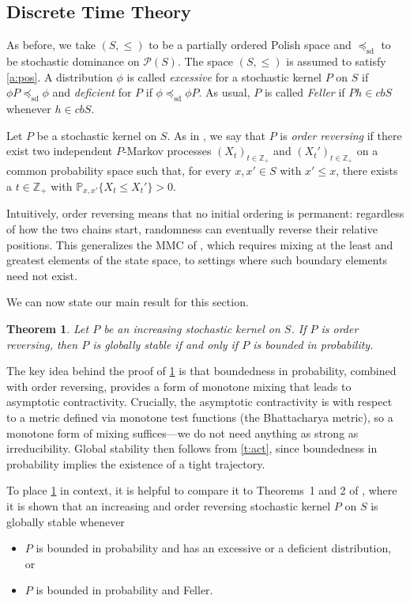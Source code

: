 \documentclass[12pt,reqno]{amsart}
\numberwithin{equation}{section}
\newtheorem{theorem}{Theorem}[section]
\theoremstyle{definition}
\newcommand{\1}{\mathbbm{1}}
\newcommand{\ZZ}{\mathbb{Z}}
\newcommand{\PP}{\mathbb P}
\newcommand{\pP}{\mathscr{P}}
\newcommand{\precsd}{\preceq_{\textrm{sd}}}
\newcommand{\navy}[1]{\textit{\textcolor{blue!40!black}{#1}}}
\begin{document}
\subsection{Discrete Time Theory}\label{ss:dtt}

As before, we take $(S, \leq)$ to be a partially ordered Polish space  and $\precsd$ to be stochastic dominance on $\pP(S)$.
The space $(S, \leq)$ is assumed to satisfy \cref{a:pos}. A
distribution $\phi$ is called \navy{excessive} for a stochastic kernel $P$ on
$S$ if $\phi P \precsd \phi$ and \navy{deficient} for $P$ if $\phi \precsd \phi P$.
As usual, $P$ is called \navy{Feller} if $P h \in cbS$ whenever $h \in cbS$.

Let $P$ be a stochastic kernel on $S$. As in \cite{kamihigashi2014stochastic},
we say that $P$ is \navy{order reversing} if there exist two independent
$P$-Markov processes $(X_t)_{t \in \ZZ_+}$ and $(X_t')_{t \in \ZZ_+}$ on a
common probability space such that,
        for every $x, x' \in S$ with $x' \leq x$, there exists a $t \in \ZZ_+$ with
        $\PP_{x,x'}\{X_t \leq X_t' \} > 0$.

Intuitively, order reversing means that no initial ordering is permanent:
regardless of how the two chains start, randomness can eventually reverse their
relative positions. This generalizes the MMC of
\cite{hopenhayn1992stochastic}, which requires mixing at the least and
greatest elements of the state space, to settings where such boundary elements
need not exist.

We can now state our main result for this section.

\begin{theorem}\label{t:orgs}
    Let $P$ be an increasing stochastic kernel on $S$.
    If $P$ is order reversing, then $P$ is globally stable if and only
            if $P$ is bounded in probability.
\end{theorem}


The key idea behind the proof of \cref{t:orgs} is that boundedness in
probability, combined with order reversing, provides a form of monotone mixing
that leads to asymptotic contractivity.  Crucially, the asymptotic contractivity
is with respect to a metric defined via monotone test functions (the
Bhattacharya metric), so a monotone form of mixing suffices---we do not need
anything as strong as irreducibility.  Global stability then follows from
\cref{t:act}, since boundedness in probability implies the existence of a tight
trajectory.

To place \cref{t:orgs} in context, it is helpful to compare it to Theorems~1 and
2 of \cite{kamihigashi2014stochastic}, where it is shown that 
an increasing and order reversing stochastic kernel $P$ on $S$ is globally
stable whenever
%
\begin{itemize}
    \item[(KS1)] $P$ is bounded in probability and has an excessive or a deficient
        distribution, or
    \item[(KS2)] $P$ is bounded in probability and Feller.
\end{itemize}
\end{document}
